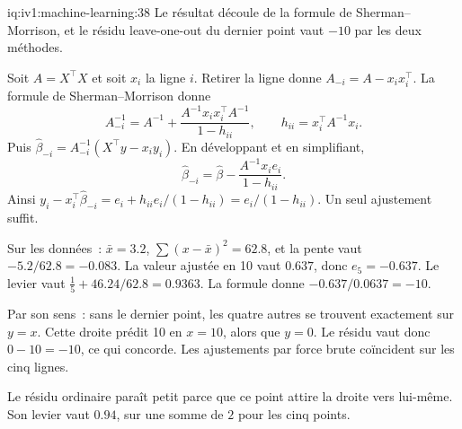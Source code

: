 \begin{solution}{iq:iv1:machine-learning:38}
Le résultat découle de la formule de Sherman--Morrison, et le résidu leave-one-out du dernier point vaut $-10$ par les deux méthodes.

Soit $A = X^\top X$ et soit $x_i$ la ligne $i$. Retirer la ligne donne $A_{-i} = A - x_ix_i^\top$. La formule de Sherman--Morrison donne
\[
A_{-i}^{-1} = A^{-1} + \frac{A^{-1}x_ix_i^\top A^{-1}}{1 - h_{ii}}, \qquad h_{ii} = x_i^\top A^{-1}x_i.
\]
Puis $\hat{\beta}_{-i} = A_{-i}^{-1}(X^\top y - x_iy_i)$. En développant et en simplifiant,
\[
\hat{\beta}_{-i} = \hat{\beta} - \frac{A^{-1}x_ie_i}{1 - h_{ii}}.
\]
Ainsi $y_i - x_i^\top\hat{\beta}_{-i} = e_i + h_{ii}e_i/(1 - h_{ii}) = e_i/(1 - h_{ii})$. Un seul ajustement suffit.

Sur les données~: $\bar{x} = 3.2$, $\sum(x - \bar{x})^2 = 62.8$, et la pente vaut $-5.2/62.8 = -0.083$. La valeur ajustée en 10 vaut $0.637$, donc $e_5 = -0.637$. Le levier vaut $\frac15 + 46.24/62.8 = 0.9363$. La formule donne $-0.637/0.0637 = -10$.

Par son sens~: sans le dernier point, les quatre autres se trouvent exactement sur $y = x$. Cette droite prédit 10 en $x = 10$, alors que $y = 0$. Le résidu vaut donc $0 - 10 = -10$, ce qui concorde. Les ajustements par force brute coïncident sur les cinq lignes.

Le résidu ordinaire paraît petit parce que ce point attire la droite vers lui-même. Son levier vaut $0.94$, sur une somme de $2$ pour les cinq points.



\end{solution}


